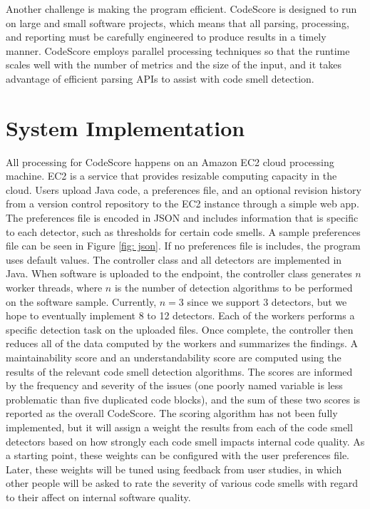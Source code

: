 \documentclass{sig-alternate}
\begin{document}
Another challenge is making the program efficient. CodeScore is designed to run
on large and small software projects, which means that all parsing, processing,
and reporting must be carefully engineered to produce results in a timely
manner. CodeScore employs parallel processing techniques so that the runtime
scales well with the number of metrics and the size of the input, and it takes
advantage of efficient parsing APIs to assist with code smell detection.


\section{System Implementation}
\label{subsec:approach}

All processing for CodeScore happens on an Amazon EC2 cloud processing machine.
EC2 is a service that provides resizable computing capacity in the cloud. 
Users upload Java code, a preferences file, and an optional revision
history from a version control repository to the EC2 instance through a simple web app. The preferences 
file is encoded in JSON and includes information that is specific to each detector, 
such as thresholds for certain code smells. A sample preferences file can be
seen in Figure \ref{fig: json}. If no preferences
file is includes, the program uses default values. The controller class and all
detectors are implemented in Java. 
When software is uploaded to the endpoint, the controller class
generates $n$ worker threads, where $n$ is the number of detection algorithms to be
performed on the software sample. Currently, $n=3$ since we support $3$
detectors, but we hope to eventually implement 8 to 12 detectors. 
Each of the workers performs a specific detection task on the uploaded files.
Once complete, the controller then reduces all of the data computed by the workers and
summarizes the findings. A maintainability score and an understandability score
are computed using the results of the relevant code smell detection
algorithms. The scores are informed by the frequency and severity of the
issues (one poorly named variable is less problematic than five duplicated code
blocks), and the sum of these two scores is reported as the overall
CodeScore. The scoring algorithm has not been fully implemented, but it will
assign a weight the results from each of the code smell detectors based on how
strongly each code smell impacts internal code quality. As a starting point,
these weights can be configured with the user preferences file. Later, these
weights will be tuned using feedback from user studies, in which other people
will be asked to rate the severity of various code smells with regard to their
affect on internal software quality.
\end{document}
